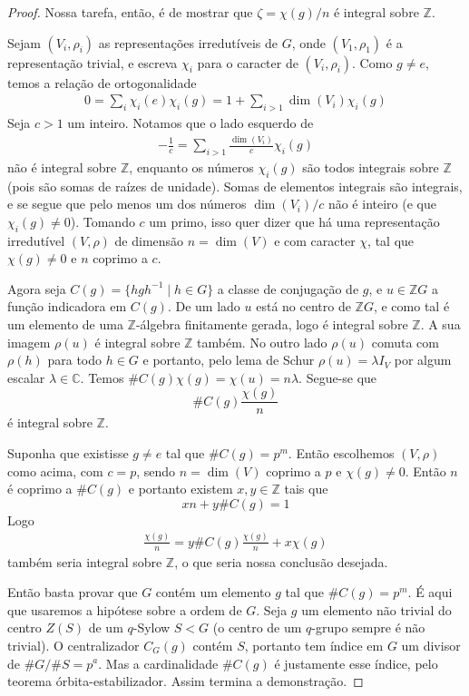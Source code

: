\documentclass[12pt]{article}
\theoremstyle{plain}
\theoremstyle{definition}
\newcommand{\C}{\mathbb{C}}
\newcommand{\Z}{\mathbb{Z}}
\newcommand{\la}{\lambda}
\begin{document}
\begin{proof}
Nossa tarefa, então, é de mostrar que $\zeta = \chi(g) / n$ é integral sobre $\Z$.

Sejam $(V_i, \rho_i)$ as representações irredutíveis de $G$, onde $(V_1, \rho_1)$ é a representação trivial, e escreva $\chi_i$ para o caracter de $(V_i, \rho_i)$. Como $g \neq e$, temos a relação de ortogonalidade
\begin{align*}
0 = \sum_{i} \chi_i(e) \chi_i(g) = 1 + \sum_{i > 1} \dim(V_i) \chi_i(g)
\end{align*}
Seja $c > 1$ um inteiro. Notamos que o lado esquerdo de
\begin{align*}
-\frac{1}{c} = \sum_{i > 1} \frac{\dim(V_i)}{c} \chi_i(g)
\end{align*}
não é integral sobre $\Z$, enquanto os números $\chi_i(g)$ são todos integrais sobre $\Z$ (pois são somas de raízes de unidade). Somas de elementos integrais são integrais, e se segue que pelo menos um dos números $\dim(V_i)/c$ não é inteiro (e que $\chi_i(g) \neq 0$). Tomando $c$ um primo, isso quer dizer que há uma representação irredutível $(V, \rho)$ de dimensão $n = \dim(V)$ e com caracter $\chi$, tal que $\chi(g) \neq 0$ e $n$ coprimo a $c$.

Agora seja $C(g) = \{h g h^{-1} \mid h \in G \}$ a classe de conjugação de $g$, e $u \in \Z G$ a função indicadora em $C(g)$. De um lado $u$ está no centro de $\Z G$, e como tal é um elemento de uma $\Z$-álgebra finitamente gerada, logo é integral sobre $\Z$. A sua imagem $\rho(u)$ é integral sobre $\Z$ também. No outro lado $\rho(u)$ comuta com $\rho(h)$ para todo $h \in G$ e portanto, pelo lema de Schur $\rho(u) = \la I_V$ por algum escalar $\la \in \C$. Temos $\#C(g) \chi(g) = \chi(u) = n \la$. Segue-se que
\[
\#C(g) \frac{\chi(g)}{n}
\]
é integral sobre $\Z$.

Suponha que existisse $g \neq e$ tal que $\#C(g) = p^m$. Então escolhemos $(V, \rho)$ como acima, com $c = p$, sendo $n = \dim(V)$ coprimo a $p$ e $\chi(g) \neq 0$. Então $n$ é coprimo a $\#C(g)$ e portanto existem $x, y \in \Z$ tais que
\[
x n + y \#C(g) = 1
\]
Logo
\begin{align*}
\frac{\chi(g)}{n} = y \#C(g) \frac{\chi(g)}{n} + x \chi(g)
\end{align*}
também seria integral sobre $\Z$, o que seria nossa conclusão desejada.

Então basta provar que $G$ contém um elemento $g$ tal que $\#C(g) = p^m$. É aqui que usaremos a hipótese sobre a ordem de $G$. Seja $g$ um elemento não trivial do centro $Z(S)$ de um $q$-Sylow $S < G$ (o centro de um $q$-grupo sempre é não trivial). O centralizador $C_G(g)$ contém $S$, portanto tem índice em $G$ um divisor de $\# G / \# S = p^a$. Mas a cardinalidade $\#C(g)$ é justamente esse índice, pelo teorema órbita-estabilizador. Assim termina a demonstração.

\end{proof}
\end{document}
